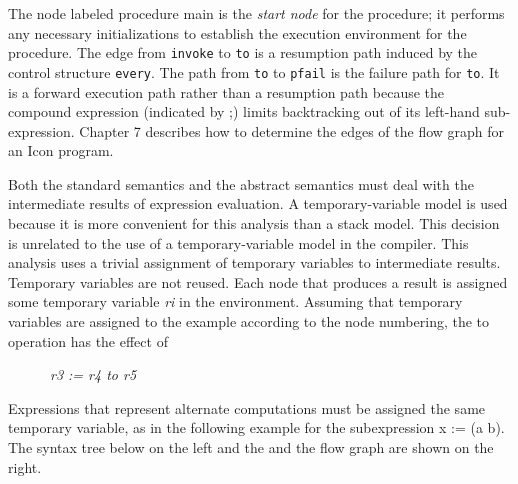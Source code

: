 The node labeled procedure main is the \textit{start node} for the
procedure; it performs any necessary initializations to establish the
execution environment for the procedure. The edge from \texttt{invoke}
to \texttt{to} is a resumption path induced by the control structure
\texttt{every}. The path from \texttt{to} to \texttt{pfail} is the
failure path for \texttt{to}. It is a forward execution path rather
than a resumption path because the compound expression (indicated by
;) limits backtracking out of its left-hand sub-expression. Chapter 7
describes how to determine the edges of the flow graph for an Icon
program.

Both the standard semantics and the abstract semantics must deal with
the intermediate results of expression evaluation.  A
temporary-variable model is used because it is more convenient for
this analysis than a stack model. This decision is unrelated to the
use of a temporary-variable model in the compiler. This analysis uses
a trivial assignment of temporary variables to intermediate
results. Temporary variables are not reused. Each node that produces a
result is assigned some temporary variable \textit{ri} in the
environment. Assuming that temporary variables are assigned to the
example according to the node numbering, the to operation has the
effect of

{\ttfamily\mdseries
\ \ \ \ \ \ \textit{r3 := r4 to r5}}

Expressions that represent alternate computations must be assigned the
same temporary variable, as in the following example for the
subexpression x := ({\textquotedbl}a{\textquotedbl} {\textbar}
{\textquotedbl}b{\textquotedbl}). The syntax tree below on the left
and the and the flow graph are shown on the right.


